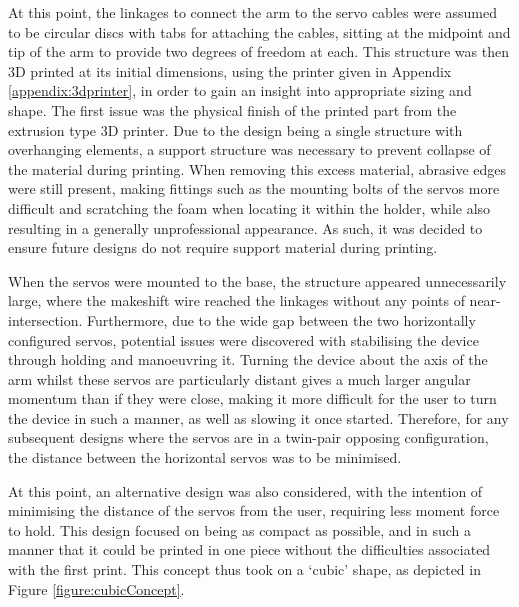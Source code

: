 \documentclass[11pt]{article}
\begin{document}
At this point, the linkages to connect the arm to the servo cables were assumed to be circular discs with tabs for attaching the cables, sitting at the midpoint and tip of the arm to provide two degrees of freedom at each. This structure was then 3D printed at its initial dimensions, using the printer given in Appendix \ref{appendix:3dprinter}, in order to gain an insight into appropriate sizing and shape. The first issue was the physical finish of the printed part from the extrusion type 3D printer. Due to the design being a single structure with overhanging elements, a support structure was necessary to prevent collapse of the material during printing. When removing this excess material, abrasive edges were still present, making fittings such as the mounting bolts of the servos more difficult and scratching the foam when locating it within the holder, while also resulting in a generally unprofessional appearance. As such, it was decided to ensure future designs do not require support material during printing. 

When the servos were mounted to the base, the structure appeared unnecessarily large, where the makeshift wire reached the linkages without any points of near-intersection. Furthermore, due to the wide gap between the two horizontally configured servos, potential issues were discovered with stabilising the device through holding and manoeuvring it. Turning the device about the axis of the arm whilst these servos are particularly distant gives a much larger angular momentum than if they were close, making it more difficult for the user to turn the device in such a manner, as well as slowing it once started. Therefore, for any subsequent designs where the servos are in a twin-pair opposing configuration, the distance between the horizontal servos was to be minimised.

At this point, an alternative design was also considered, with the intention of minimising the distance of the servos from the user, requiring less moment force to hold. This design focused on being as compact as possible, and in such a manner that it could be printed in one piece without the difficulties associated with the first print. This concept thus took on a `cubic' shape, as depicted in Figure \ref{figure:cubicConcept}.
\end{document}
